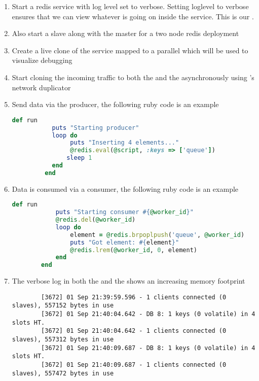 \begin{adjustwidth}{0.5cm}{}
	\begin{enumerate}
		\item Start a redis service with log level set to verbose. Setting loglevel to verbose ensures that we can view whatever is going on inside the service. This is our \productioncontainer.
		\item Also start a slave along with the master for a two node redis deployment
		\item Create a live clone of the service mapped to a parallel \debugcontainer which will be used to visualize debugging
		\item Start cloning the incoming traffic to both the \productioncontainer and the \debugcontainer asynchronously using \parikshan's network duplicator
		
		\item Send data via the producer, the following ruby code is an example
		
		\begin{lstlisting}[language=ruby]
		def run
		   puts "Starting producer"
		   loop do
		        puts "Inserting 4 elements..."
		        @redis.eval(@script, :keys => ['queue'])
	           sleep 1
		   end
		 end
		\end{lstlisting}
		
		\item Data is consumed via a consumer, the following ruby code is an example
		
		\begin{lstlisting}[language=ruby]
		def run
			puts "Starting consumer #{@worker_id}"
			@redis.del(@worker_id)
			loop do
				element = @redis.brpoplpush('queue', @worker_id)
				puts "Got element: #{element}"
				@redis.lrem(@worker_id, 0, element)
			end
		end		
		\end{lstlisting}
		
		\item The verbose log in both the \productioncontainer and the \debugcontainer shows an increasing memory footprint
		
		\begin{lstlisting}
		[3672] 01 Sep 21:39:59.596 - 1 clients connected (0 slaves), 557152 bytes in use
		[3672] 01 Sep 21:40:04.642 - DB 8: 1 keys (0 volatile) in 4 slots HT.
		[3672] 01 Sep 21:40:04.642 - 1 clients connected (0 slaves), 557312 bytes in use
		[3672] 01 Sep 21:40:09.687 - DB 8: 1 keys (0 volatile) in 4 slots HT.
		[3672] 01 Sep 21:40:09.687 - 1 clients connected (0 slaves), 557472 bytes in use
		\end{lstlisting}
		
	\end{enumerate}
\end{adjustwidth}



